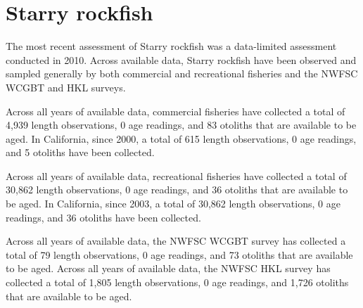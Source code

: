 \documentclass[11pt,
  english,
  letterpaper,
]{article}
\begin{document}

\hypertarget{starry-rockfish}{%
\section{Starry rockfish}\label{starry-rockfish}}

\leavevmode\tagmcend\tagstructend


The most recent assessment of Starry rockfish was a data-limited assessment conducted in 2010. Across available data, Starry rockfish have been observed and sampled generally by both commercial and recreational fisheries and the NWFSC WCGBT and HKL surveys.

\leavevmode\tagmcend\tagstructend\par


Across all years of available data, commercial fisheries have collected a total of 4,939 length observations, 0 age readings, and 83 otoliths that are available to be aged. In California, since 2000, a total of 615 length observations, 0 age readings, and 5 otoliths have been collected.

\leavevmode\tagmcend\tagstructend\par


Across all years of available data, recreational fisheries have collected a total of 30,862 length observations, 0 age readings, and 36 otoliths that are available to be aged. In California, since 2003, a total of 30,862 length observations, 0 age readings, and 36 otoliths have been collected.

\leavevmode\tagmcend\tagstructend\par


Across all years of available data, the NWFSC WCGBT survey has collected a total of 79 length observations, 0 age readings, and 73 otoliths that are available to be aged. Across all years of available data, the NWFSC HKL survey has collected a total of 1,805 length observations, 0 age readings, and 1,726 otoliths that are available to be aged.

\leavevmode\tagmcend\tagstructend\par

\end{document}
